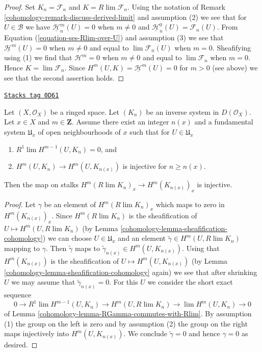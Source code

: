 \begin{proof}

Set $K_n = \mathcal{F}_n$ and $K = R\lim \mathcal{F}_n$. Using the notation
of Remark \ref{cohomology-remark-discuss-derived-limit} and assumption (2) we see that for
$U \in \mathcal{B}$ we have $\underline{\mathcal{H}}_n^m(U) = 0$
when $m \not = 0$ and $\underline{\mathcal{H}}_n^0(U) = \mathcal{F}_n(U)$.
From Equation (\ref{equation-ses-Rlim-over-U}) and assumption (3)
we see that $\underline{\mathcal{H}}^m(U) = 0$
when $m \not = 0$ and equal to $\lim \mathcal{F}_n(U)$
when $m = 0$. Sheafifying using (1) we find that
$\mathcal{H}^m = 0$ when $m \not = 0$ and equal to
$\lim \mathcal{F}_n$ when $m = 0$. Hence $K = \lim \mathcal{F}_n$.
Since $H^m(U, K) = \underline{\mathcal{H}}^m(U) = 0$ for $m > 0$
(see above) we see that the second assertion holds.
\end{proof}

\begin{lemma}
\label{cohomology-lemma-cohomology-derived-limit-injective}
\href{https://stacks.math.columbia.edu/tag/0D61}{\texttt{Stacks tag 0D61}}

Let $(X, \mathcal{O}_X)$ be a ringed space. Let $(K_n)$ be an
inverse system in $D(\mathcal{O}_X)$. Let $x \in X$ and $m \in \mathbf{Z}$.
Assume there exist an integer $n(x)$ and a fundamental system $\mathfrak{U}_x$
of open neighbourhoods of $x$ such that for $U \in \mathfrak{U}_x$
\begin{enumerate}
\item $R^1\lim H^{m - 1}(U, K_n) = 0$, and
\item $H^m(U, K_n) \to H^m(U, K_{n(x)})$ is injective
for $n \geq n(x)$.
\end{enumerate}
Then the map on stalks $H^m(R\lim K_n)_x \to H^m(K_{n(x)})_x$ is injective.
\end{lemma}

\begin{proof}

Let $\gamma$ be an element of $H^m(R\lim K_n)_x$ which maps to zero
in $H^m(K_{n(x)})_x$. Since $H^m(R\lim K_n)$ is the sheafification
of $U \mapsto H^m(U, R\lim K_n)$
(by Lemma \ref{cohomology-lemma-sheafification-cohomology})
we can choose $U \in \mathfrak{U}_x$
and an element $\tilde \gamma \in H^m(U, R\lim K_n)$ mapping to $\gamma$.
Then $\tilde\gamma$ maps to $\tilde\gamma_{n(x)} \in H^m(U, K_{n(x)})$.
Using that $H^m(K_{n(x)})$ is the sheafification of
$U \mapsto H^m(U, K_{n(x)})$
(by Lemma \ref{cohomology-lemma-sheafification-cohomology} again)
we see that after shrinking $U$ we may assume that $\tilde\gamma_{n(x)} = 0$.
For this $U$ we consider the short exact sequence
$$
0 \to
R^1\lim H^{m - 1}(U, K_n) \to H^m(U, R\lim K_n) \to
\lim H^m(U, K_n) \to 0
$$
of Lemma \ref{cohomology-lemma-RGamma-commutes-with-Rlim}.
By assumption (1) the group on the left is zero and by
assumption (2) the group on the right maps injectively
into $H^m(U, K_{n(x)})$. We conclude $\tilde\gamma = 0$
and hence $\gamma = 0$ as desired.
\end{proof}

